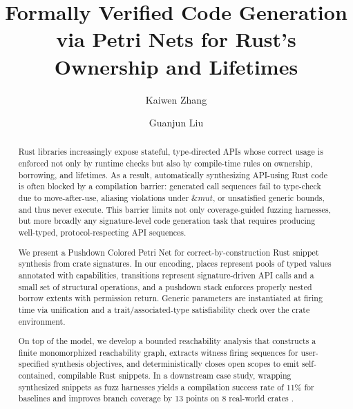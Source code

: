 \documentclass[sigconf]{acmart}
\begin{document}
\title{Formally Verified Code Generation via Petri Nets for Rust’s Ownership and Lifetimes}

\author{Kaiwen Zhang}
\author{Guanjun Liu}
\authornotemark[1]

\renewcommand{\shortauthors}{Kaiwen et al.}

\begin{abstract}
Rust libraries increasingly expose stateful, type-directed APIs whose correct usage is enforced not only by runtime checks but also by compile-time rules on ownership, borrowing, and lifetimes. As a result, automatically synthesizing API-using Rust code is often blocked by a compilation barrier: generated call sequences fail to type-check due to move-after-use, aliasing violations under $\&mut$, or unsatisfied generic bounds, and thus never execute. This barrier limits not only coverage-guided fuzzing harnesses, but more broadly any signature-level code generation task that requires producing well-typed, protocol-respecting API sequences.

We present a Pushdown Colored Petri Net for correct-by-construction Rust snippet synthesis from crate signatures. In our encoding, places represent pools of typed values annotated with capabilities, transitions represent signature-driven API calls and a small set of structural operations, and a pushdown stack enforces properly nested borrow extents with permission return. Generic parameters are instantiated at firing time via unification and a trait/associated-type satisfiability check over the crate environment.

On top of the model, we develop a bounded reachability analysis that constructs a finite monomorphized reachability graph, extracts witness firing sequences for user-specified synthesis objectives, and deterministically closes open scopes to emit self-contained, compilable Rust snippets. In a downstream case study, wrapping synthesized snippets as fuzz harnesses yields a compilation success rate of 11\% for baselines and improves branch coverage by 13 points on 8 real-world crates .
\end{abstract}
\end{document}
